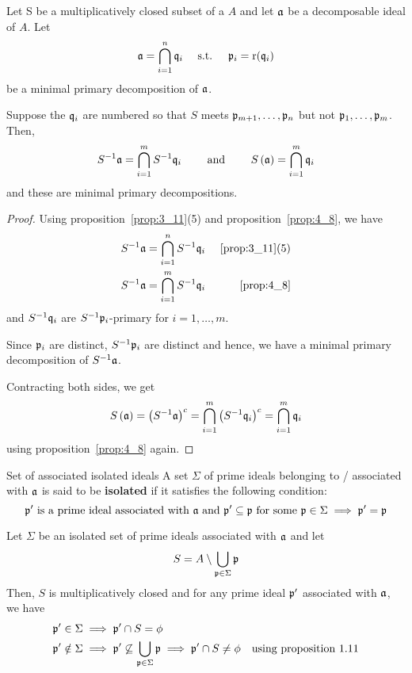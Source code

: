 \begin{proposition}{}{}
\label{prop:4_9}
	Let S be a multiplicatively closed subset of a \(A\) and let \(\mathfrak{a}\)
	be a decomposable ideal of \(A\).
	Let
	\[
		\mathfrak{a} = \bigcap_{i = 1}^{n} \mathfrak{q}_i \quad \text{ s.t. } \quad \mathfrak{p}_i = \operatorname{r}(\mathfrak{q}_i)
	\]
	be a minimal primary decomposition of \(\mathfrak{a}\).

	Suppose the \(\mathfrak{q}_i\) are numbered so that \(S\) meets
	\(\mathfrak{p}_{m+1}, \ldots, \mathfrak{p}_n\) but not \(\mathfrak{p}_1, \ldots, \mathfrak{p}_m\).
	Then,
	\[
		S^{-1}\mathfrak{a} = \bigcap_{i = 1}^{m} S^{-1}\mathfrak{q}_i
		\quad\quad \text{ and } \quad\quad
		S\left( \mathfrak{a} \right) = \bigcap_{i = 1}^{m} \mathfrak{q}_i
	\]
	and these are minimal primary decompositions.
\end{proposition}
\begin{proof}
	Using proposition~\ref{prop:3_11}(5) and proposition~\ref{prop:4_8},
	we have
	\begin{align*}
		S^{-1}\mathfrak{a} &= \bigcap_{i = 1}^{n} S^{-1}\mathfrak{q}_i
			&~\text{\ref{prop:3_11}(5)} \\
		S^{-1}\mathfrak{a} &= \bigcap_{i = 1}^{m} S^{-1}\mathfrak{q}_i
			&~\text{\ref{prop:4_8}} \\
	\end{align*}
	and \(S^{-1}\mathfrak{q}_i\) are \(S^{-1}\mathfrak{p}_i\)-primary for
	\(i = 1, \ldots, m\).

	Since \(\mathfrak{p}_i\) are distinct, \(S^{-1}\mathfrak{p}_i\) are distinct
	and hence, we have a minimal primary decomposition of \(S^{-1}\mathfrak{a}\).

	Contracting both sides, we get
	\[
		S\left( \mathfrak{a} \right) = \left( S^{-1}\mathfrak{a} \right)^c =
		\bigcap_{i = 1}^{m} \left( S^{-1}\mathfrak{q}_i \right)^c
		= \bigcap_{i = 1}^{m} \mathfrak{q}_i
	\]
	using proposition~\ref{prop:4_8} again.
\end{proof}

\begin{defn}{Set of associated isolated ideals}{}
	A set \(\Sigma\) of prime ideals belonging to / associated with \(\mathfrak{a}\)
	is said to be \textbf{isolated} if it satisfies the following condition:
	\[
		\mathfrak{p}' \text{ is a prime ideal associated with } \mathfrak{a} \text{ and }
		\mathfrak{p}' \subseteq \mathfrak{p} \text{ for some } \mathfrak{p} \in \Sigma
		\implies \mathfrak{p}' = \mathfrak{p}
	\]
\end{defn}

\begin{proposition}{}{}
	Let \(\Sigma\) be an isolated set of prime ideals associated with
	\(\mathfrak{a}\) and let
	\[
		S = A \setminus \bigcup_{\mathfrak{p} \in \Sigma} \mathfrak{p}
	\]
	Then, \(S\) is multiplicatively closed and for any prime ideal
	\(\mathfrak{p}'\) associated with \(\mathfrak{a}\), we have
	\begin{align*}
		\mathfrak{p}' \in \Sigma &\implies \mathfrak{p}' \cap S = \phi \\
		\mathfrak{p}' \notin \Sigma &\implies \mathfrak{p}' \not\subseteq
		\bigcup_{\mathfrak{p} \in \Sigma} \mathfrak{p} \implies \mathfrak{p}' \cap S \neq \phi
		& \text{using proposition 1.11}
	\end{align*}
\end{proposition}

